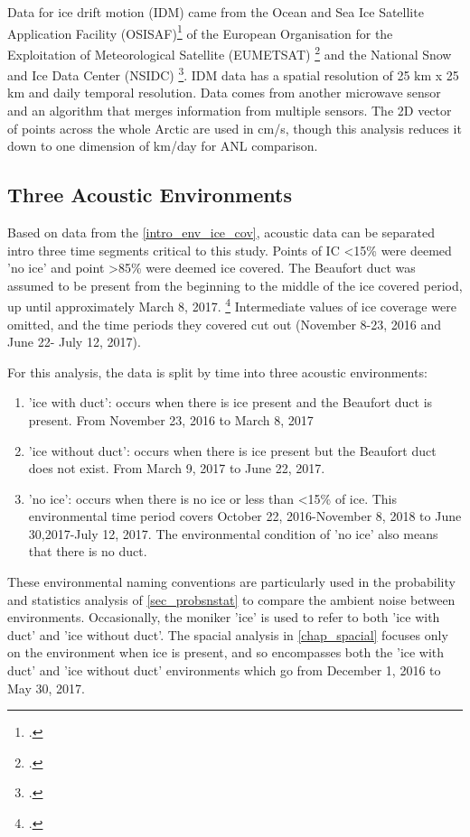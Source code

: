 Data for ice drift motion (IDM) came from the Ocean and Sea Ice Satellite Application Facility (OSISAF)\footcite[]{osisaf_data} of the European Organisation for the Exploitation of Meteorological Satellite (EUMETSAT) \footcite[]{osisaf_man} and the National Snow and Ice Data Center (NSIDC) \footcite[]{Tschudi2019polar}. IDM data has a spatial resolution of 25 km x 25 km and daily temporal resolution. Data comes from another microwave sensor and an algorithm that merges information from multiple sensors. The 2D vector of points across the whole Arctic are used in cm/s, though this analysis reduces it down to one dimension of km/day for ANL comparison. 

\subsection{Three Acoustic Environments} \label{intro_env_split}

Based on data from the \autoref{intro_env_ice_cov}, acoustic data can be separated intro three time segments critical to this study. Points of IC <15\% were deemed 'no ice' and point >85\% were deemed ice covered. The Beaufort duct was assumed to be present from the beginning to the middle of the ice covered period, up until approximately March 8, 2017. \footcite[]{ballard2020temporal} Intermediate values of ice coverage were omitted, and the time periods they covered cut out (November 8-23, 2016 and June 22- July 12, 2017).

For this analysis, the data is split by time into three acoustic environments:
\begin{enumerate}
    \item{'ice with duct': occurs when there is ice present and the Beaufort duct is present. From November 23, 2016 to March 8, 2017}
    \item{'ice without duct': occurs when there is ice present but the Beaufort duct does not exist. From March 9, 2017 to June 22, 2017.    }
    \item{'no ice': occurs when there is no ice or less than <15\% of ice. This environmental time period covers October 22, 2016-November 8, 2018 to June 30,2017-July 12, 2017. The environmental condition of 'no ice' also means that there is no duct.}
\end{enumerate}

These environmental naming conventions are particularly used in the probability and statistics analysis of \autoref{sec_probsnstat} to compare the ambient noise between environments. Occasionally, the moniker 'ice' is used to refer to both 'ice with duct' and 'ice without duct'. The spacial analysis in \autoref{chap_spacial} focuses only on the environment when ice is present, and so encompasses both the 'ice with duct' and 'ice without duct' environments which go from December 1, 2016 to May 30, 2017. 


